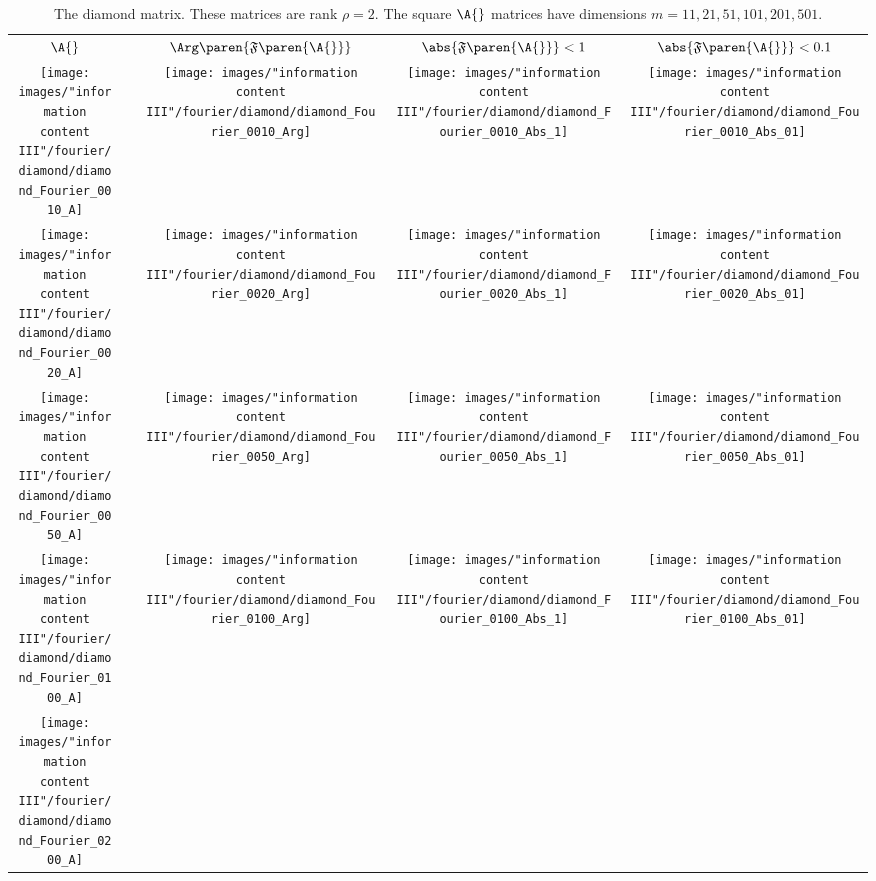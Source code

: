 \begin{table}[htdp]
\caption[The diamond matrix]{The diamond matrix. These matrices are rank $\rho = 2$. The square $\A{}$ matrices have dimensions $m=11,21,51,101,201,501$.}
\begin{center}
\begin{tabular}{ccccc}
%
  $\A{}$ &\phantom{=}& $\Arg\paren{\mathfrak{F}\paren{\A{}}}$ &  $\abs{\mathfrak{F}\paren{\A{}}}<1$  &  $\abs{\mathfrak{F}\paren{\A{}}}<0.1$  \\
%
 \texttt{[image: images/"information content III"/fourier/diamond/diamond\_Fourier\_0010\_A]} &&
 \texttt{[image: images/"information content III"/fourier/diamond/diamond\_Fourier\_0010\_Arg]} &
 \texttt{[image: images/"information content III"/fourier/diamond/diamond\_Fourier\_0010\_Abs\_1]} &
 \texttt{[image: images/"information content III"/fourier/diamond/diamond\_Fourier\_0010\_Abs\_01]} \\
%
 \texttt{[image: images/"information content III"/fourier/diamond/diamond\_Fourier\_0020\_A]} &&
 \texttt{[image: images/"information content III"/fourier/diamond/diamond\_Fourier\_0020\_Arg]} &
 \texttt{[image: images/"information content III"/fourier/diamond/diamond\_Fourier\_0020\_Abs\_1]} &
 \texttt{[image: images/"information content III"/fourier/diamond/diamond\_Fourier\_0020\_Abs\_01]} \\
%
 \texttt{[image: images/"information content III"/fourier/diamond/diamond\_Fourier\_0050\_A]} &&
 \texttt{[image: images/"information content III"/fourier/diamond/diamond\_Fourier\_0050\_Arg]} &
 \texttt{[image: images/"information content III"/fourier/diamond/diamond\_Fourier\_0050\_Abs\_1]} &
 \texttt{[image: images/"information content III"/fourier/diamond/diamond\_Fourier\_0050\_Abs\_01]} \\
%
 \texttt{[image: images/"information content III"/fourier/diamond/diamond\_Fourier\_0100\_A]} &&
 \texttt{[image: images/"information content III"/fourier/diamond/diamond\_Fourier\_0100\_Arg]} &
 \texttt{[image: images/"information content III"/fourier/diamond/diamond\_Fourier\_0100\_Abs\_1]} &
 \texttt{[image: images/"information content III"/fourier/diamond/diamond\_Fourier\_0100\_Abs\_01]} \\
%
 \texttt{[image: images/"information content III"/fourier/diamond/diamond\_Fourier\_0200\_A]} &&

\end{tabular}
\end{center}
\end{table}
